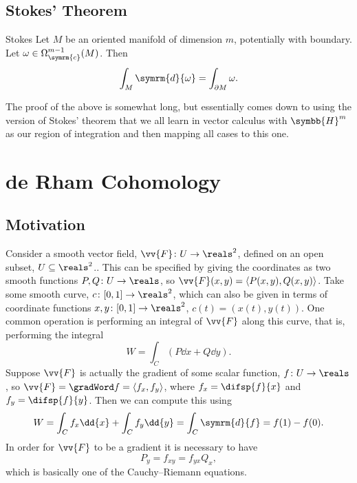 \documentclass[fleqn]{NotesClass}
\renewcommand{\dl}{\symrm{d}}
\newcommand{\upperHalfSpace}{\symbb{H}}
\newcommand{\compact}{\symrm{c}}
\begin{document}
    \section{Stokes' Theorem}
    \begin{thm}{Stokes}{}
        Let \(M\) be an oriented manifold of dimension \(m\), potentially with boundary.
        Let \(\omega \in \Omega_{\compact}^{m - 1}(M)\).
        Then
        \begin{equation}
            \int_M \dl{\omega} = \int_{\partial M} \omega.
        \end{equation}
    \end{thm}
    
    The proof of the above is somewhat long, but essentially comes down to using the version of Stokes' theorem that we all learn in vector calculus with \(\upperHalfSpace^m\) as our region of integration and then mapping all cases to this one.
    
    \chapter{de Rham Cohomology}
    \section{Motivation}
    Consider a smooth vector field,  \(\vv{F} \colon U \to \reals^2\), defined on an open subset, \(U \subseteq \reals^2\)..
    This can be specified by giving the coordinates as two smooth functions \(P, Q \colon U \to \reals\), so \(\vv{F}(x, y) = \langle P(x, y), Q(x, y) \rangle\).
    Take some smooth curve, \(c \colon [0, 1] \to \reals^2\), which can also be given in terms of coordinate functions \(x, y \colon [0, 1] \to \reals^2\), \(c(t) = (x(t), y(t))\).
    One common operation is performing an integral of \(\vv{F}\) along this curve, that is, performing the integral
    \begin{equation}
        W = \int_C (P \dd{x} + Q\dd{y}).
    \end{equation}
    Suppose \(\vv{F}\) is actually the gradient of some scalar function, \(f \colon U \to \reals\), so \(\vv{F} = \gradWord f = \langle f_x, f_y \rangle\), where \(f_x = \difsp{f}{x}\) and \(f_y = \difsp{f}{y}\).
    Then we can compute this using
    \begin{equation}
        W = \int_C f_x \dd{x} + \int_C f_y \dd{y} = \int_C \dl{f} = f(1) - f(0).
    \end{equation}
    In order for \(\vv{F}\) to be a gradient it is necessary to have
    \begin{equation}
        P_y = f_{xy} = f_{yx}  Q_x,
    \end{equation}
    which is basically one of the Cauchy--Riemann equations.
    
\end{document}
